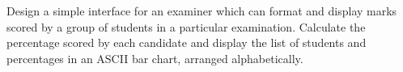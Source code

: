 

\problem Design a simple interface for an examiner which can format and display marks scored by a group
of students in a particular examination. Calculate the percentage scored by each candidate and display the
list of students and percentages in an ASCII bar chart, arranged alphabetically.

\solution

\sourcecode

